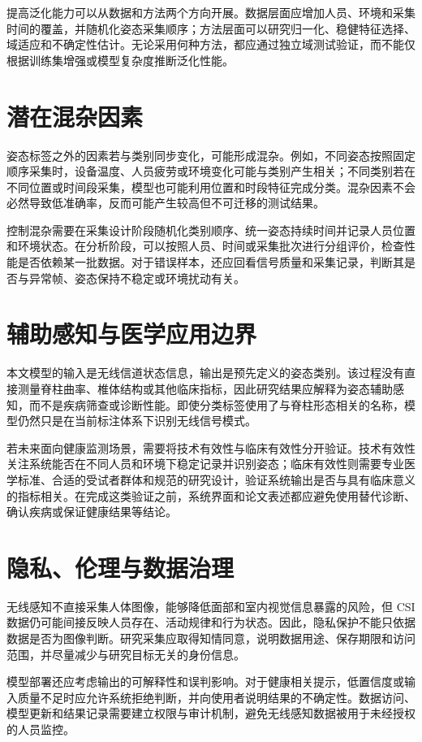 提高泛化能力可以从数据和方法两个方向开展。数据层面应增加人员、环境和采集时间的覆盖，并随机化姿态采集顺序；方法层面可以研究归一化、稳健特征选择、域适应和不确定性估计。无论采用何种方法，都应通过独立域测试验证，而不能仅根据训练集增强或模型复杂度推断泛化性能。

\section{潜在混杂因素}
姿态标签之外的因素若与类别同步变化，可能形成混杂。例如，不同姿态按照固定顺序采集时，设备温度、人员疲劳或环境变化可能与类别产生相关；不同类别若在不同位置或时间段采集，模型也可能利用位置和时段特征完成分类。混杂因素不会必然导致低准确率，反而可能产生较高但不可迁移的测试结果。

控制混杂需要在采集设计阶段随机化类别顺序、统一姿态持续时间并记录人员位置和环境状态。在分析阶段，可以按照人员、时间或采集批次进行分组评价，检查性能是否依赖某一批数据。对于错误样本，还应回看信号质量和采集记录，判断其是否与异常帧、姿态保持不稳定或环境扰动有关。

\section{辅助感知与医学应用边界}
本文模型的输入是无线信道状态信息，输出是预先定义的姿态类别。该过程没有直接测量脊柱曲率、椎体结构或其他临床指标，因此研究结果应解释为姿态辅助感知，而不是疾病筛查或诊断性能。即使分类标签使用了与脊柱形态相关的名称，模型仍然只是在当前标注体系下识别无线信号模式。

若未来面向健康监测场景，需要将技术有效性与临床有效性分开验证。技术有效性关注系统能否在不同人员和环境下稳定记录并识别姿态；临床有效性则需要专业医学标准、合适的受试者群体和规范的研究设计，验证系统输出是否与具有临床意义的指标相关。在完成这类验证之前，系统界面和论文表述都应避免使用替代诊断、确认疾病或保证健康结果等结论。

\section{隐私、伦理与数据治理}
\enlargethispage{\baselineskip}
无线感知不直接采集人体图像，能够降低面部和室内视觉信息暴露的风险，但 CSI 数据仍可能间接反映人员存在、活动规律和行为状态。因此，隐私保护不能只依据数据是否为图像判断。研究采集应取得知情同意，说明数据用途、保存期限和访问范围，并尽量减少与研究目标无关的身份信息。

模型部署还应考虑输出的可解释性和误判影响。对于健康相关提示，低置信度或输入质量不足时应允许系统拒绝判断，并向使用者说明结果的不确定性。数据访问、模型更新和结果记录需要建立权限与审计机制，避免无线感知数据被用于未经授权的人员监控。


